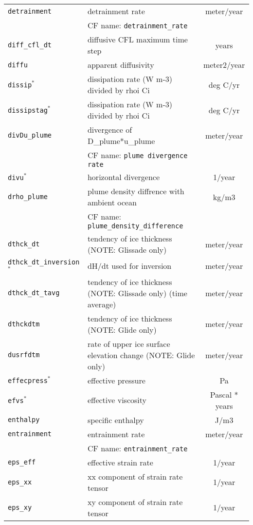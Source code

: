 \begin{center}
\begin{supertabular}{|l|p{8cm}|c|}
\hline
\texttt{detrainment} & detrainment rate & meter/year\\
&CF name: \texttt{detrainment\_rate}&\\
\hline
\texttt{diff\_cfl\_dt} & diffusive CFL maximum time step & years\\
\hline
\texttt{diffu} & apparent diffusivity & meter2/year\\
\hline
\texttt{dissip}$^\ast$ & dissipation rate (W m-3) divided by rhoi Ci & deg C/yr\\
\hline
\texttt{dissipstag}$^\ast$ & dissipation rate (W m-3) divided by rhoi Ci & deg C/yr\\
\hline
\texttt{divDu\_plume} & divergence of D\_plume*u\_plume & meter/year\\
&CF name: \texttt{plume divergence rate}&\\
\hline
\texttt{divu}$^\ast$ & horizontal divergence & 1/year\\
\hline
\texttt{drho\_plume} & plume density diffrence with ambient ocean & kg/m3\\
&CF name: \texttt{plume\_density\_difference}&\\
\hline
\texttt{dthck\_dt} & tendency of ice thickness (NOTE: Glissade only) & meter/year\\
\hline
\texttt{dthck\_dt\_inversion}$^\ast$ & dH/dt used for inversion & meter/year\\
\hline
\texttt{dthck\_dt\_tavg} & tendency of ice thickness (NOTE: Glissade only) (time average) & meter/year\\
\hline
\texttt{dthckdtm} & tendency of ice thickness (NOTE: Glide only) & meter/year\\
\hline
\texttt{dusrfdtm} & rate of upper ice surface elevation change (NOTE: Glide only) & meter/year\\
\hline
\texttt{effecpress}$^\ast$ & effective pressure & Pa\\
\hline
\texttt{efvs}$^\ast$ & effective viscosity & Pascal * years\\
\hline
\texttt{enthalpy} & specific enthalpy & J/m3\\
\hline
\texttt{entrainment} & entrainment rate & meter/year\\
&CF name: \texttt{entrainment\_rate}&\\
\hline
\texttt{eps\_eff} & effective strain rate & 1/year\\
\hline
\texttt{eps\_xx} & xx component of strain rate tensor & 1/year\\
\hline
\texttt{eps\_xy} & xy component of strain rate tensor & 1/year\\

\end{supertabular}
\end{center}
